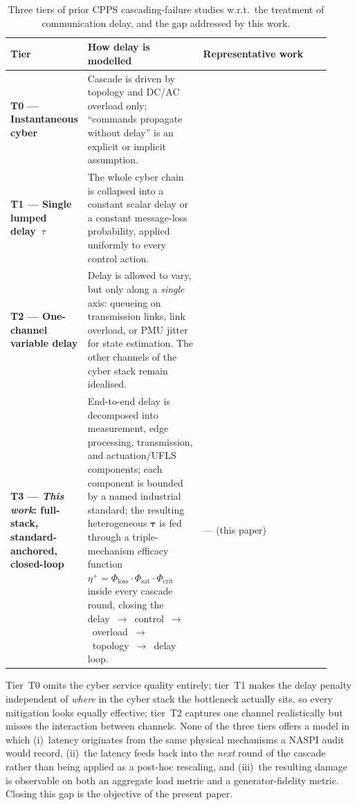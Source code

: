\begin{table}[!t]
\centering
\caption{Three tiers of prior CPPS cascading-failure studies w.r.t.\ the
treatment of communication delay, and the gap addressed by this work.}
\label{tab:prior_tiers}
\small
\begin{tabular}{@{}p{0.16\linewidth}p{0.36\linewidth}p{0.40\linewidth}@{}}
\toprule
\textbf{Tier} & \textbf{How delay is modelled} & \textbf{Representative work} \\
\midrule
\textbf{T0 — Instantaneous cyber} &
Cascade is driven by topology and DC/AC overload only;
``commands propagate without delay'' is an explicit or implicit
assumption. &
\citet{Motter2002,Dobson2007,Brummitt2012,Buldyrev2010,Gao2012} \\[2pt]
\textbf{T1 — Single lumped delay~$\tau$} &
The whole cyber chain is collapsed into a constant scalar delay or a
constant message-loss probability, applied uniformly to every
control action. &
\citet{Cai2016TSG,Falahati2014TSG,Guo2017AppliedEnergy,Huang2015} \\[2pt]
\textbf{T2 — One-channel variable delay} &
Delay is allowed to vary, but only along a \emph{single} axis: queueing
on transmission links, link overload, or PMU jitter for state
estimation. The other channels of the cyber stack remain idealised. &
\citet{Xin2024CPPSframework,LinkOverload2024Electronics,Wang2022CPPS,LaiCPPS2019} \\[2pt]
\textbf{T3 — \emph{This work}: full-stack, standard-anchored,
closed-loop} &
End-to-end delay is decomposed into measurement, edge processing,
transmission, and actuation/UFLS components; each component is bounded
by a named industrial standard; the resulting heterogeneous $\boldsymbol{\tau}$
is fed through a triple-mechanism efficacy function
$\eta^{+}=\Phi_{\mathrm{loss}}\!\cdot\!\Phi_{\mathrm{sat}}\!\cdot\!
\Phi_{\mathrm{crit}}$ inside every cascade round, closing the
delay~$\to$~control~$\to$~overload~$\to$~topology~$\to$~delay loop. &
--- (this paper) \\
\bottomrule
\end{tabular}
\end{table}

Tier~T0 omits the cyber service quality entirely; tier~T1 makes
the delay penalty independent of \emph{where} in the cyber stack the
bottleneck actually sits, so every mitigation looks equally effective;
tier~T2 captures one channel realistically but misses the interaction
between channels.  None of the three tiers offers a model in which
(i)~latency originates from the same physical mechanisms a NASPI
audit would record, (ii)~the latency feeds back into the
\emph{next} round of the cascade rather than being applied as a
post-hoc rescaling, and (iii)~the resulting damage is observable on
both an aggregate load metric and a generator-fidelity metric.  Closing
this gap is the objective of the present paper.

